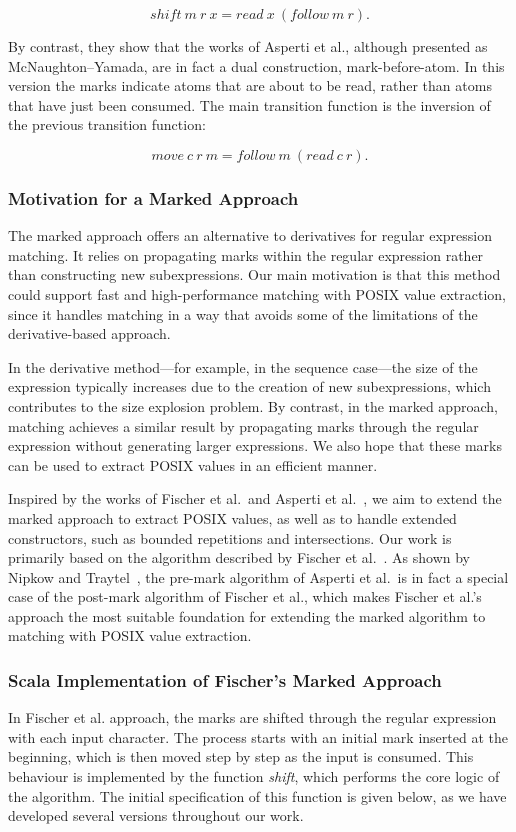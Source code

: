 \documentclass[12pt]{article}
\newcommand{\shift}{\textit{shift}}
\begin{document}
\[
shift\ m\ r\ x = read\ x\ (follow\ m\ r).
\] 

By contrast, they show that the works of Asperti et al., although presented 
as McNaughton--Yamada, are in fact a dual construction, mark-before-atom. 
In this version the marks indicate atoms that are about to be read, rather 
than atoms that have just been consumed. The main transition function is 
the inversion of the previous transition function:

\[
move\ c\ r\ m = follow\ m\ (read\ c\ r).
\]

\FloatBarrier
\subsubsection{Motivation for a Marked Approach}

The marked approach offers an alternative to derivatives for regular expression matching.  
It relies on propagating marks within the regular expression rather than constructing new subexpressions.  
Our main motivation is that this method could support fast and high-performance matching with POSIX value extraction,  
since it handles matching in a way that avoids some of the limitations of the derivative-based approach.  

In the derivative method—for example, in the sequence case—the size of the expression typically increases  
due to the creation of new subexpressions, which contributes to the size explosion problem.  
By contrast, in the marked approach, matching achieves a similar result by propagating marks through the regular expression  
without generating larger expressions.  
We also hope that these marks can be used to extract POSIX values in an efficient manner.  

Inspired by the works of Fischer et al.\ and Asperti et al.~\cite{Fischer2010, Asperti2010},  
we aim to extend the marked approach to extract POSIX values, as well as to handle extended constructors, such as bounded 
repetitions and intersections. Our work is primarily based on the algorithm described by Fischer et al.~\cite{Fischer2010}.  
As shown by Nipkow and Traytel~\cite{NipkowTraytel2014}, the pre-mark algorithm of Asperti et al.\ is in fact a special case of the  
post-mark algorithm of Fischer et al., which makes Fischer et al.’s approach the most suitable foundation for extending the marked  
algorithm to matching with POSIX value extraction.

\FloatBarrier
\subsubsection{Scala Implementation of Fischer’s Marked Approach}
\label{sec:scala-fischer}
In Fischer et al. approach, the marks are shifted through the regular expression with each input character. 
The process starts with an initial mark inserted at the beginning, which is then moved step by step as the input is consumed. 
This behaviour is implemented by the function \shift, which performs the core logic of the algorithm. 
The initial specification of this function is given below, as we have developed several versions throughout our work.
\end{document}
